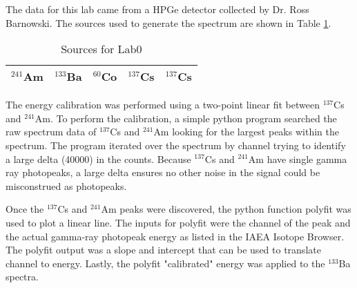 The data for this lab came from a HPGe detector collected by Dr. Ross Barnowski. The sources used to generate the spectrum are shown in Table \ref{tab:sources}.

\begin{table}[]
\centering
\caption{Sources for Lab0}
\label{tab:sources}
\begin{tabular}{@{}lllll@{}}
$^{241}$Am & $^{133}$Ba & $^{60}$Co & $^{137}$Cs & $^{137}$Cs \\ \bottomrule
\end{tabular}
\end{table}

The energy calibration was performed using a two-point linear fit between $^{137}$Cs and $^{241}$Am. To perform the calibration, a simple python program searched the raw spectrum data of $^{137}$Cs and $^{241}$Am looking for the largest peaks within the spectrum. The program iterated over the spectrum by channel trying to identify a large delta (40000) in the counts. Because $^{137}$Cs and $^{241}$Am have single gamma ray photopeaks, a large delta ensures no other noise in the signal could be misconstrued as photopeaks.

Once the $^{137}$Cs and $^{241}$Am peaks were discovered, the python function polyfit was used to plot a linear line. The inputs for polyfit were the channel of the peak and the actual gamma-ray photopeak energy as listed in the IAEA Isotope Browser. The polyfit output was a slope and intercept that can be used to translate channel to energy. Lastly, the polyfit "calibrated" energy was applied to the $^{133}$Ba spectra.
